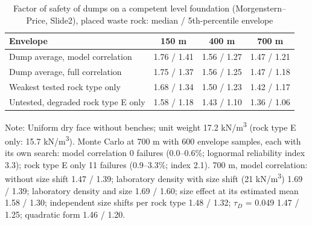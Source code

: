 \documentclass[Journal,letterpaper]{ascelike-new}
\begin{document}
\begin{table}
\caption{Factor of safety of dumps on a competent level foundation (Morgenstern--Price, Slide2), placed waste rock: median / 5th-percentile envelope}
\label{tab:4}
\centering\small
\renewcommand{\arraystretch}{1.15}
\begin{tabular}{lccc}
\hline\hline
Envelope & 150 m & 400 m & 700 m \\
\hline
Dump average, model correlation & 1.76 / 1.41 & 1.56 / 1.27 & 1.47 / 1.21 \\
Dump average, full correlation & 1.75 / 1.37 & 1.56 / 1.25 & 1.47 / 1.18 \\
Weakest tested rock type only & 1.68 / 1.34 & 1.50 / 1.23 & 1.42 / 1.17 \\
Untested, degraded rock type E only & 1.58 / 1.18 & 1.43 / 1.10 & 1.36 / 1.06 \\
\hline\hline
\end{tabular}
\par\vspace{4pt}\parbox{\linewidth}{\footnotesize Note: Uniform dry face without benches; unit weight 17.2 kN/m\textsuperscript{3} (rock type E only: 15.7 kN/m\textsuperscript{3}). Monte Carlo at 700 m with 600 envelope samples, each with its own search: model correlation 0 failures (0.0--0.6\%; lognormal reliability index 3.3); rock type E only 11 failures (0.9--3.3\%; index 2.1). 700 m, model correlation: without size shift 1.47 / 1.39; laboratory density with size shift (21 kN/m\textsuperscript{3}) 1.69 / 1.39; laboratory density and size 1.69 / 1.60; size effect at its estimated mean 1.58 / 1.30; independent size shifts per rock type 1.48 / 1.32; $\tau_D$ = 0.049 1.47 / 1.25; quadratic form 1.46 / 1.20.}
\end{table}
\end{document}
